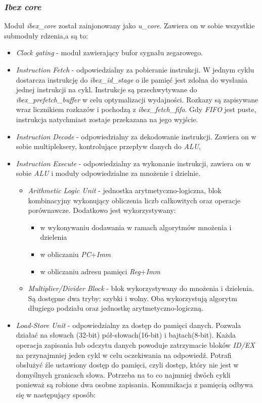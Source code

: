 \documentclass[11pt,a4paper]{article}
\begin{document}
	\subsubsection{\textit{Ibex core}}
	\hspace{5mm}
		Moduł \textit{ibex\_core} został zainjonowany jako \textit{u\_core}. Zawiera on w sobie wszystkie submoduły rdzenia,a są to:
\begin{itemize}
	\item \textit{Clock gating} - moduł zawierający bufor sygnału zegarowego.
	\item \textit{Instruction Fetch} - odpowiedzialny za pobieranie instrukcji. W jednym cyklu dostarcza instrukcję do \textit{ibex\_id\_stage} o ile pamięć jest zdolna do wysłania jednej instrukcji na cykl. Instrukcje są przechwytywane do \textit{ibex\_prefetch\_buffer} w celu optymalizacji wydajności. Rozkazy są zapisywane wraz licznikiem rozkazów i pochodzą z \textit{ibex\_fetch\_fifo}. Gdy  \textit{FIFO} jest puste, instrukcja natychmiast zostaje przekazana na jego wyjście.
	\item \textit{Instruction Decode} - odpowiedzialny za dekodowanie instrukcji. Zawiera on w sobie multipleksery, kontrolujące przepływ danych do \textit{ALU},
	\item \textit{Instruction Execute} - odpowiedzialny za wykonanie instrukcji, zawiera on w sobie \textit{ALU} i moduły odpowiedzialne za mnożenie i dzielnie. 
	\begin{itemize}
		\item \textit{Arithmetic Logic Unit} - jednostka arytmetyczno-logiczna, blok kombinacyjny wykonujący obliczenia liczb całkowitych oraz operacje porównawcze.
		Dodatkowo jest wykorzystywany:
		\begin{itemize}
			\item w wykonywaniu dodawania w ramach algorytmów mnożenia i dzielenia
			\item w obliczaniu \textit{PC}+\textit{Imm}
			\item w obliczaniu adresu pamięci \textit{Reg}+\textit{Imm}
		\end{itemize}
		\item \textit{Multiplier/Divider Block} - blok wykorzystywany do mnożenia i dzielenia. Są dostępne dwa tryby: szybki i wolny. Oba wykorzystują algorytm długiego podziału oraz jednostkę arytmetyczno-logiczną.
	\end{itemize}
	\item \textit{Load-Store Unit} - odpowiedzialny za dostęp do pamięci danych. Pozwala działać na słowach (32-bit) pół-słowach(16-bit) i bajtach(8-bit). Każda operacja zapisania lub odczytu danych powoduje zatrzymacie bloków \textit{ID/EX} na przynajmniej jeden cykl w celu oczekiwania na odpowiedź. Potrafi obsłużyć źle   ustawiony dostęp do pamięci, czyli dostęp, który nie jest w domyślnych granicach słowa. Potrzeba na to co najmniej dwóch cykli ponieważ są robione dwa osobne zapisania. Komunikacja z pamięcią odbywa się w następujący sposób:

\end{itemize}
\end{document}
